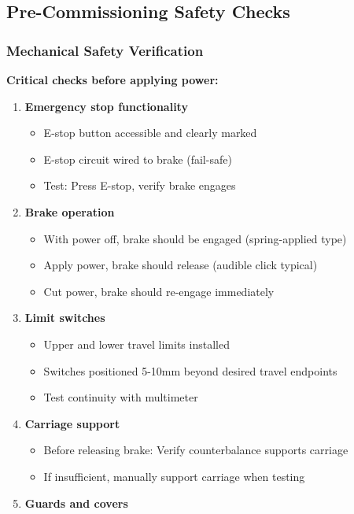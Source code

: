 \documentclass[
]{article}
\providecommand{\tightlist}{%
  \setlength{\itemsep}{0pt}\setlength{\parskip}{0pt}}
\begin{document}
\subsection{Pre-Commissioning Safety
Checks}\label{pre-commissioning-safety-checks}

\subsubsection{Mechanical Safety
Verification}\label{mechanical-safety-verification}

\textbf{Critical checks before applying power:}

\begin{enumerate}
\def\labelenumi{\arabic{enumi}.}
\tightlist
\item
  \textbf{Emergency stop functionality}

  \begin{itemize}
  \tightlist
  \item
    E-stop button accessible and clearly marked
  \item
    E-stop circuit wired to brake (fail-safe)
  \item
    Test: Press E-stop, verify brake engages
  \end{itemize}
\item
  \textbf{Brake operation}

  \begin{itemize}
  \tightlist
  \item
    With power off, brake should be engaged (spring-applied type)
  \item
    Apply power, brake should release (audible click typical)
  \item
    Cut power, brake should re-engage immediately
  \end{itemize}
\item
  \textbf{Limit switches}

  \begin{itemize}
  \tightlist
  \item
    Upper and lower travel limits installed
  \item
    Switches positioned 5-10mm beyond desired travel endpoints
  \item
    Test continuity with multimeter
  \end{itemize}
\item
  \textbf{Carriage support}

  \begin{itemize}
  \tightlist
  \item
    Before releasing brake: Verify counterbalance supports carriage
  \item
    If insufficient, manually support carriage when testing
  \end{itemize}
\item
  \textbf{Guards and covers}


\end{enumerate}
\end{document}
